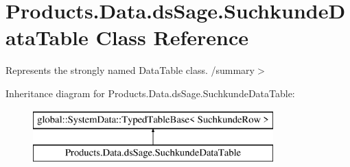 \hypertarget{class_products_1_1_data_1_1ds_sage_1_1_suchkunde_data_table}{}\section{Products.\+Data.\+ds\+Sage.\+Suchkunde\+Data\+Table Class Reference}
\label{class_products_1_1_data_1_1ds_sage_1_1_suchkunde_data_table}


Represents the strongly named Data\+Table class. /summary$>$  


Inheritance diagram for Products.\+Data.\+ds\+Sage.\+Suchkunde\+Data\+Table\+:\begin{figure}[H]
\begin{center}
\leavevmode
\includegraphics[height=2.000000cm]{class_products_1_1_data_1_1ds_sage_1_1_suchkunde_data_table}
\end{center}
\end{figure}
